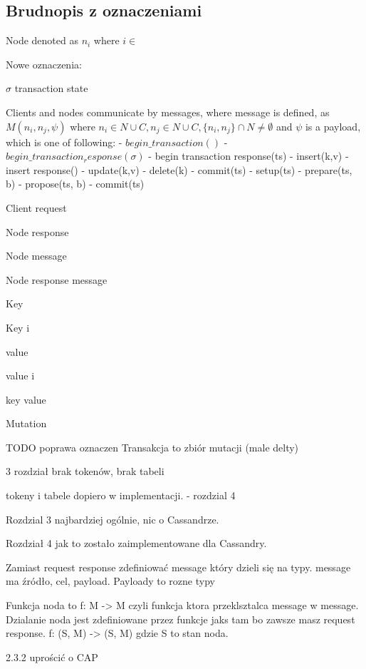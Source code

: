 \subsection{Brudnopis z oznaczeniami}

Node denoted as $n_i$ where $i \in $


Nowe oznaczenia:

$\sigma$ transaction state

Clients and nodes communicate by messages, where message is defined, as $\mathit{M}(n_{i}, n_{j}, \psi)$ where 
$n_{i}\in\mathit{N}\cup\mathit{C}, n_{j}\in\mathit{N}\cup\mathit{C},\{n_{i}, n_{j}\}\cap\mathit{N}\neq\emptyset$ and $\psi$ is a payload, which is one of following:
- $\mathit{begin\_transaction}()$
- $\mathit{begin\_transaction_response}(\sigma)$
- begin transaction response(ts)
- insert(k,v)
- insert response()
- update(k,v)
- delete(k)
- commit(ts)
- setup(ts)
- prepare(ts, b)
- propose(ts, b)
- commit(ts)


Client request 

Node response 

Node message 

Node response message 

Key \key

Key i 

value \kvalue

value i 

key value \kv

Mutation 

TODO poprawa oznaczen
Transakcja to zbiór mutacji (male delty)

3 rozdział brak tokenów, brak tabeli

tokeny i tabele dopiero w implementacji.  - rozdzial 4

Rozdzial 3 najbardziej ogólnie, nic o Cassandrze.

Rozdział 4 jak to zostało zaimplementowane dla Cassandry.

Zamiast request response zdefiniować message który dzieli się na typy.
message ma źródło, cel, payload. Payloady to rozne typy

Funkcja noda to f: M -> M 
czyli funkcja ktora przeklsztalca message w message. 
Dzialanie noda jest zdefiniowane przez funkcje jaks tam bo zawsze masz request response.
f: (S, M) -> (S, M)
gdzie S to stan noda.

2.3.2 uprościć o CAP

